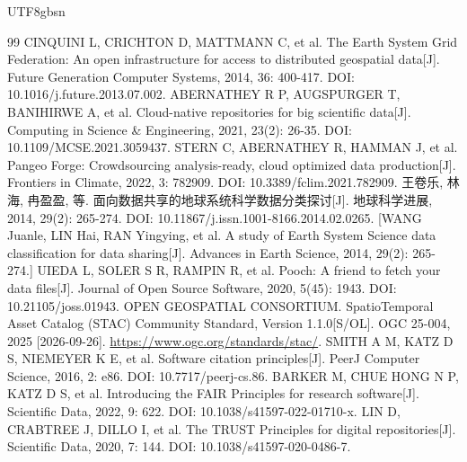 \documentclass[numdoi]{chinese}
\begin{document}
\begin{CJK}{UTF8}{gbsn}
\begin{thebibliography}{99}
CINQUINI L, CRICHTON D, MATTMANN C, et al. The Earth System Grid Federation: An open infrastructure for access to distributed geospatial data[J]. Future Generation Computer Systems, 2014, 36: 400-417. DOI: 10.1016/j.future.2013.07.002.
ABERNATHEY R P, AUGSPURGER T, BANIHIRWE A, et al. Cloud-native repositories for big scientific data[J]. Computing in Science \& Engineering, 2021, 23(2): 26-35. DOI: 10.1109/MCSE.2021.3059437.
STERN C, ABERNATHEY R, HAMMAN J, et al. Pangeo Forge: Crowdsourcing analysis-ready, cloud optimized data production[J]. Frontiers in Climate, 2022, 3: 782909. DOI: 10.3389/fclim.2021.782909.
王卷乐, 林海, 冉盈盈, 等. 面向数据共享的地球系统科学数据分类探讨[J]. 地球科学进展, 2014, 29(2): 265-274. DOI: 10.11867/j.issn.1001-8166.2014.02.0265. [WANG Juanle, LIN Hai, RAN Yingying, et al. A study of Earth System Science data classification for data sharing[J]. Advances in Earth Science, 2014, 29(2): 265-274.]
UIEDA L, SOLER S R, RAMPIN R, et al. Pooch: A friend to fetch your data files[J]. Journal of Open Source Software, 2020, 5(45): 1943. DOI: 10.21105/joss.01943.
OPEN GEOSPATIAL CONSORTIUM. SpatioTemporal Asset Catalog (STAC) Community Standard, Version 1.1.0[S/OL]. OGC 25-004, 2025 [2026-09-26]. \url{https://www.ogc.org/standards/stac/}.
SMITH A M, KATZ D S, NIEMEYER K E, et al. Software citation principles[J]. PeerJ Computer Science, 2016, 2: e86. DOI: 10.7717/peerj-cs.86.
BARKER M, CHUE HONG N P, KATZ D S, et al. Introducing the FAIR Principles for research software[J]. Scientific Data, 2022, 9: 622. DOI: 10.1038/s41597-022-01710-x.
LIN D, CRABTREE J, DILLO I, et al. The TRUST Principles for digital repositories[J]. Scientific Data, 2020, 7: 144. DOI: 10.1038/s41597-020-0486-7.
\end{thebibliography}\endgroup
\end{CJK}
\end{document}
